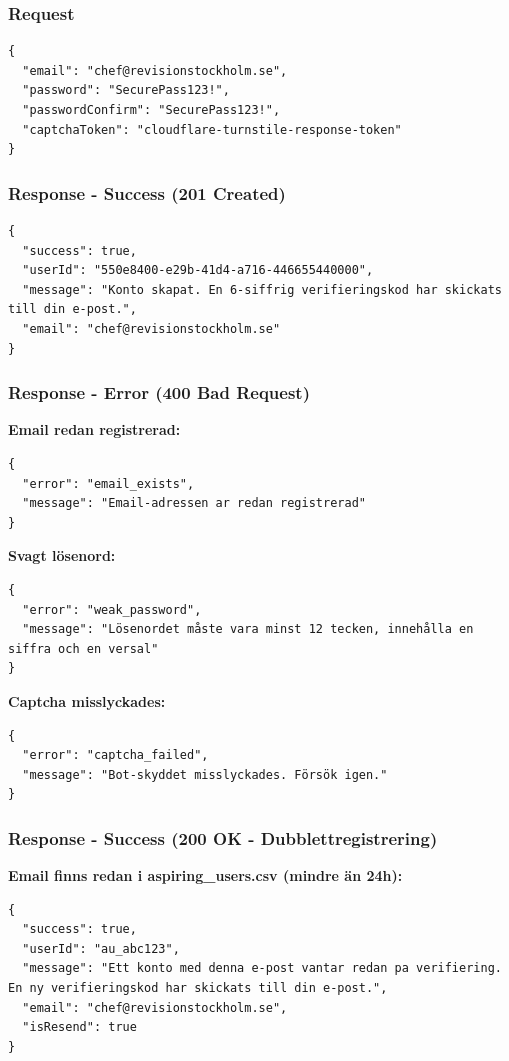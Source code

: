 \documentclass[12pt,a4paper]{article}
\begin{document}
\subsubsection{Request}
\begin{lstlisting}
{
  "email": "chef@revisionstockholm.se",
  "password": "SecurePass123!",
  "passwordConfirm": "SecurePass123!",
  "captchaToken": "cloudflare-turnstile-response-token"
}
\end{lstlisting}

\subsubsection{Response - Success (201 Created)}
\begin{lstlisting}
{
  "success": true,
  "userId": "550e8400-e29b-41d4-a716-446655440000",
  "message": "Konto skapat. En 6-siffrig verifieringskod har skickats till din e-post.",
  "email": "chef@revisionstockholm.se"
}
\end{lstlisting}

\subsubsection{Response - Error (400 Bad Request)}
\textbf{Email redan registrerad:}
\begin{lstlisting}
{
  "error": "email_exists",
  "message": "Email-adressen ar redan registrerad"
}
\end{lstlisting}

\textbf{Svagt lösenord:}
\begin{lstlisting}
{
  "error": "weak_password",
  "message": "Lösenordet måste vara minst 12 tecken, innehålla en siffra och en versal"
}
\end{lstlisting}

\textbf{Captcha misslyckades:}
\begin{lstlisting}
{
  "error": "captcha_failed",
  "message": "Bot-skyddet misslyckades. Försök igen."
}
\end{lstlisting}

\subsubsection{Response - Success (200 OK - Dubblettregistrering)}
\textbf{Email finns redan i aspiring\_users.csv (mindre än 24h):}
\begin{lstlisting}
{
  "success": true,
  "userId": "au_abc123",
  "message": "Ett konto med denna e-post vantar redan pa verifiering. En ny verifieringskod har skickats till din e-post.",
  "email": "chef@revisionstockholm.se",
  "isResend": true
}
\end{lstlisting}
\end{document}
